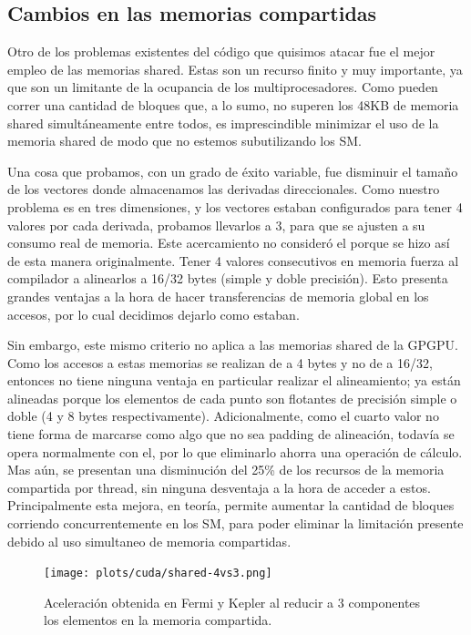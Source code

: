 \subsection{Cambios en las memorias compartidas}
Otro de los problemas existentes del c\'odigo que quisimos atacar fue el mejor empleo de las
memorias shared. Estas son un recurso finito y muy importante, ya que son un limitante de
la ocupancia de los multiprocesadores. Como pueden correr una cantidad de bloques que, a lo sumo,
no superen los 48KB de memoria shared simult\'aneamente entre todos, es imprescindible minimizar
el uso de la memoria shared de modo que no estemos subutilizando los SM.

Una cosa que probamos, con un grado de \'exito variable, fue disminuir el tama\~no de los vectores
donde almacenamos las derivadas direccionales. Como nuestro problema es en tres dimensiones,
y los vectores estaban configurados para tener 4 valores por cada derivada, probamos llevarlos a
3, para que se ajusten a su consumo real de memoria. Este acercamiento no consider\'o el porque
se hizo as\'i de esta manera originalmente. Tener 4 valores consecutivos en memoria fuerza
al compilador a alinearlos a 16/32 bytes (simple y doble precisi\'on).
Esto presenta grandes ventajas a la hora de hacer transferencias de memoria global en los accesos,
por lo cual decidimos dejarlo como estaban.

Sin embargo, este mismo criterio no aplica a las memorias shared de la GPGPU. Como los accesos
a estas memorias se realizan de a 4 bytes y no de a 16/32, entonces no tiene ninguna ventaja
en particular realizar el alineamiento; ya est\'an alineadas porque los elementos de cada punto
son flotantes de precisi\'on simple o doble (4 y 8 bytes respectivamente). Adicionalmente, como el
cuarto valor no tiene forma de marcarse como algo que no sea padding de alineaci\'on, todav\'ia se
opera normalmente con el, por lo que eliminarlo ahorra una operaci\'on de c\'alculo. Mas a\'un,
se presentan una disminuci\'on del 25\% de los recursos de la memoria compartida por thread,
sin ninguna desventaja a la hora de acceder a estos. Principalmente esta mejora, en teor\'ia, permite
aumentar la cantidad de bloques corriendo concurrentemente en los SM, para poder eliminar
la limitaci\'on presente debido al uso simultaneo de memoria compartidas.

\begin{figure}[htbp]
   \centering
   \texttt{[image: plots/cuda/shared-4vs3.png]}
   \caption{Aceleraci\'on obtenida en Fermi y Kepler al reducir a 3 componentes los
   elementos en la memoria compartida.}
   \label{fig:shared4vs3}
\end{figure}

